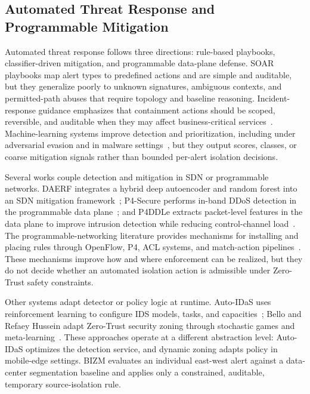 \documentclass[final,5p]{elsarticle}
\begin{document}
\subsection{Automated Threat Response and Programmable Mitigation}
\label{sec:rw_threat_response}

Automated threat response follows three directions: rule-based playbooks, classifier-driven mitigation, and programmable data-plane defense. SOAR playbooks map alert types to predefined actions and are simple and auditable, but they generalize poorly to unknown signatures, ambiguous contexts, and permitted-path abuses that require topology and baseline reasoning. Incident-response guidance emphasizes that containment actions should be scoped, reversible, and auditable when they may affect business-critical services~\cite{cichonski2012incident,nelson2025incident,belhaj2023cybersecurityautomation}. Machine-learning systems improve detection and prioritization, including under adversarial evasion and in malware settings~\cite{jAA-IDS25,cAPELID-ATH25,jMDOB25,jHybridWSD23}, but they output scores, classes, or coarse mitigation signals rather than bounded per-alert isolation decisions.

Several works couple detection and mitigation in SDN or programmable networks. DAERF integrates a hybrid deep autoencoder and random forest into an SDN mitigation framework~\cite{mhamdi2024daerf}; P4-Secure performs in-band DDoS detection in the programmable data plane~\cite{manocchio2025p4secure}; and P4DDLe extracts packet-level features in the data plane to improve intrusion detection while reducing control-channel load~\cite{doriguzzi2024packet}. The programmable-networking literature provides mechanisms for installing and placing rules through OpenFlow, P4, ACL systems, and match-action pipelines~\cite{mckeown2008openflow,bosshart2014p4,farhady2015software,ghasemi2022portcatcher}. These mechanisms improve how and where enforcement can be realized, but they do not decide whether an automated isolation action is admissible under Zero-Trust safety constraints.

Other systems adapt detector or policy logic at runtime. Auto-IDaS uses reinforcement learning to configure IDS models, tasks, and capacities~\cite{lin2024autoidas}; Bello and Refaey Hussein adapt Zero-Trust security zoning through stochastic games and meta-learning~\cite{bello2025dynamic}. These approaches operate at a different abstraction level: Auto-IDaS optimizes the detection service, and dynamic zoning adapts policy in mobile-edge settings. BIZM evaluates an individual east-west alert against a data-center segmentation baseline and applies only a constrained, auditable, temporary source-isolation rule.
\end{document}
